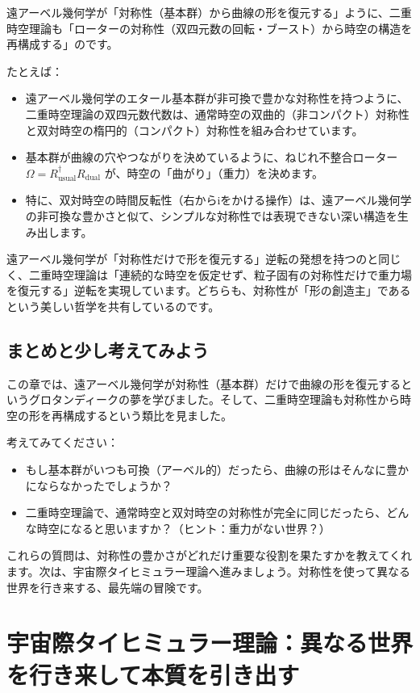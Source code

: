 \documentclass[dvipdfmx,12pt,a4paper]{jsarticle}
\begin{document}
遠アーベル幾何学が「対称性（基本群）から曲線の形を復元する」ように、二重時空理論も「ローターの対称性（双四元数の回転・ブースト）から時空の構造を再構成する」のです。

たとえば：
\begin{itemize}
  \item 遠アーベル幾何学のエタール基本群が非可換で豊かな対称性を持つように、二重時空理論の双四元数代数は、通常時空の双曲的（非コンパクト）対称性と双対時空の楕円的（コンパクト）対称性を組み合わせています。
  \item 基本群が曲線の穴やつながりを決めているように、ねじれ不整合ローター $\Omega = R_{\text{usual}}^\dagger R_{\text{dual}}$ が、時空の「曲がり」（重力）を決めます。
  \item 特に、双対時空の時間反転性（右からiをかける操作）は、遠アーベル幾何学の非可換な豊かさと似て、シンプルな対称性では表現できない深い構造を生み出します。
\end{itemize}

遠アーベル幾何学が「対称性だけで形を復元する」逆転の発想を持つのと同じく、二重時空理論は「連続的な時空を仮定せず、粒子固有の対称性だけで重力場を復元する」逆転を実現しています。どちらも、対称性が「形の創造主」であるという美しい哲学を共有しているのです。

\subsection{まとめと少し考えてみよう}

この章では、遠アーベル幾何学が対称性（基本群）だけで曲線の形を復元するというグロタンディークの夢を学びました。そして、二重時空理論も対称性から時空の形を再構成するという類比を見ました。

考えてみてください：
\begin{itemize}
  \item もし基本群がいつも可換（アーベル的）だったら、曲線の形はそんなに豊かにならなかったでしょうか？
  \item 二重時空理論で、通常時空と双対時空の対称性が完全に同じだったら、どんな時空になると思いますか？（ヒント：重力がない世界？）
\end{itemize}

これらの質問は、対称性の豊かさがどれだけ重要な役割を果たすかを教えてくれます。次は、宇宙際タイヒミュラー理論へ進みましょう。対称性を使って異なる世界を行き来する、最先端の冒険です。

\section{宇宙際タイヒミュラー理論：異なる世界を行き来して本質を引き出す}
\end{document}
